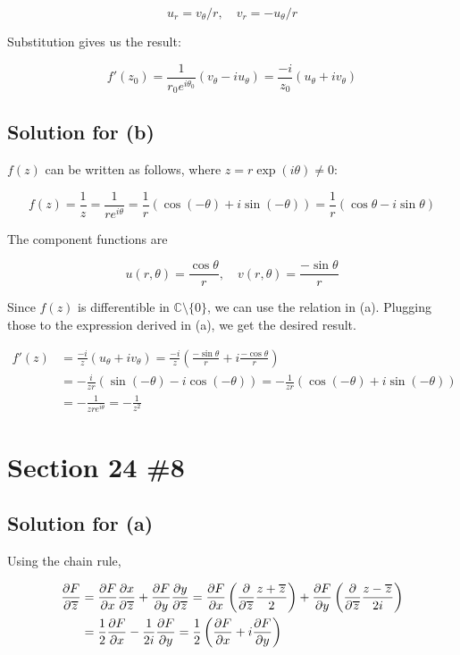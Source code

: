 \documentclass{scrartcl}
\newcommand\Overline[2][0.8pt]{%
  \begin{tikzpicture}[baseline=(a.base)]
    \node[inner xsep=0pt,inner ysep=1.5pt] (a) {$#2$};
    \draw[line width= #1] (a.north west) -- (a.north east);
  \end{tikzpicture}
}
\begin{document}
\[
  u_r = v_\theta / r, \quad v_r = -u_\theta / r
\]

Substitution gives us the result:

\[
  f'(z_0) = \frac{1}{r_0 e^{i\theta_0}} (v_\theta - iu_\theta) = \frac{-i}{z_0} (u_\theta + iv_\theta)
\]

\subsection{Solution for (b)}
\(f(z)\) can be written as follows, where \(z = r\exp(i\theta) \not = 0\):

\[
  f(z) = \frac{1}{z} = \frac{1}{r e^{i\theta}} = \frac{1}{r} (\cos (-\theta) + i\sin (-\theta)) = \frac{1}{r} (\cos \theta - i\sin \theta)
\]

The component functions are

\[
  u(r, \theta) = \frac{\cos \theta}{r}, \quad v(r, \theta) = \frac{-\sin \theta}{r}
\]

Since \(f(z)\) is differentible in \(\mathbb{C} \setminus \{0\}\), we can use the relation in (a).
Plugging those to the expression derived in (a), we get the desired result.

\begin{align*}
  f'(z) &= \frac{-i}{z} (u_\theta + iv_\theta) = \frac{-i}{z} \left(\frac{-\sin \theta}{r} + i \frac{-\cos \theta}{r}\right) \\
  &= -\frac{i}{zr} \left( \sin(-\theta) - i\cos(-\theta) \right) = -\frac{1}{zr} (\cos(-\theta) + i\sin(-\theta)) \\
  &= -\frac{1}{zre^{i\theta}} = -\frac{1}{z^2}
\end{align*}

\section{Section 24 \#8}
\subsection{Solution for (a)}
Using the chain rule,

\begin{align*}
  \frac{\partial F}{\partial \Overline{z}} &= \frac{\partial F}{\partial x} \frac{\partial x}{\partial \Overline{z}} + \frac{\partial F}{\partial y} \frac{\partial y}{\partial \Overline{z}} = \frac{\partial F}{\partial x} \left( \frac{\partial}{\partial \Overline{z}} \frac{z + \Overline{z}}{2} \right) + \frac{\partial F}{\partial y} \left( \frac{\partial}{\partial \Overline{z}} \frac{z - \Overline{z}}{2i} \right) \\
 &= \frac{1}{2} \frac{\partial F}{\partial x} - \frac{1}{2i} \frac{\partial F}{\partial y} = \frac{1}{2} \left( \frac{\partial F}{\partial x} + i \frac{\partial F}{\partial y} \right)
\end{align*}
\end{document}

